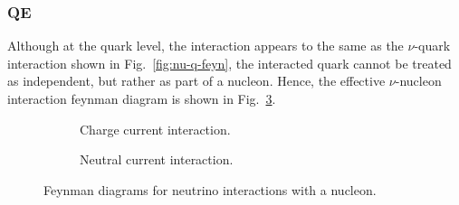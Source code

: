     \subsubsection{QE}
    Although at the quark level, the interaction appears to the same as the $\nu$-quark interaction shown in Fig.~\ref{fig:nu-q-feyn}, the interacted quark cannot be treated as independent, but rather as part of a nucleon.
    Hence, the effective $\nu$-nucleon interaction feynman diagram is shown in Fig.~\ref{fig:nu-n-feyn}.
    \begin{figure}[h]
      \centering
      \begin{subfigure}[b]{0.45\textwidth}
        \centering
        \caption{Charge current interaction.}
        \label{fig:cc-interaction-n}
      \end{subfigure}
      \hfill
      \begin{subfigure}[b]{0.45\textwidth}
        \centering
        \caption{Neutral current interaction.}
        \label{fig:nc-interaction-n}
      \end{subfigure}
      \caption{Feynman diagrams for neutrino interactions with a nucleon.}
      \label{fig:nu-n-feyn}
    \end{figure}
